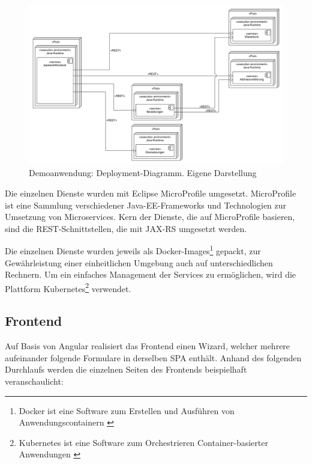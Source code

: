 \begin{figure}[H]
	\centering
	\includegraphics[width=1.00\linewidth]{img/04_erstellung-poc/demoanwendung_deployment.png}
	\caption{Demoanwendung: Deployment-Diagramm. Eigene Darstellung}
	\label{fig:demoanwendung_deployment}
\end{figure}

Die einzelnen Dienste wurden mit Eclipse MicroProfile \cite{EclipseMicroprofile} umgesetzt. MicroProfile ist eine Sammlung verschiedener Java-EE-Frameworks und Technologien zur Umsetzung von Microservices. Kern der Dienste, die auf MicroProfile basieren, sind die REST-Schnittstellen, die mit JAX-RS umgesetzt werden.

Die einzelnen Dienste wurden jeweils als Docker-Images\footnote{Docker \cite{Docker} ist eine Software zum Erstellen und Ausführen von Anwendungscontainern \cite{PatternsForSoftwareOrchestration}} gepackt, zur Gewährleistung einer einheitlichen Umgebung auch auf unterschiedlichen Rechnern. Um ein einfaches Management der Services zu ermöglichen, wird die Plattform Kubernetes\footnote{Kubernetes \cite{Kubernetes} ist eine Software zum Orchestrieren Container-basierter Anwendungen \cite{KeyCharacteristicsOfAContainerOrchestrationPlatform}} verwendet.

\subsection{Frontend}

Auf Basis von Angular realisiert das Frontend einen Wizard, welcher mehrere aufeinander folgende Formulare in derselben SPA enthält. Anhand des folgenden Durchlaufs werden die einzelnen Seiten des Frontends beispielhaft veranschaulicht:


